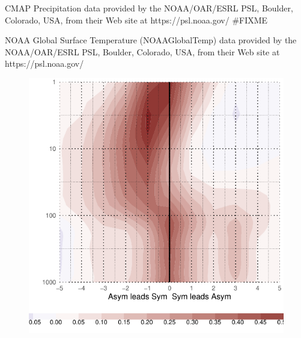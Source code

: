 \documentclass[]{ametsocV5}
\begin{document}
\acknowledgments

CMAP Precipitation data provided by the NOAA/OAR/ESRL PSL, Boulder,
Colorado, USA, from their Web site at https://psl.noaa.gov/ \#FIXME

NOAA Global Surface Temperature (NOAAGlobalTemp) data provided by the
NOAA/OAR/ESRL PSL, Boulder, Colorado, USA, from their Web site at
https://psl.noaa.gov/



\newpage

\appendix


\begin{figure}
\includegraphics{A1-1} \label{fig:A1}
\end{figure}
\end{document}
